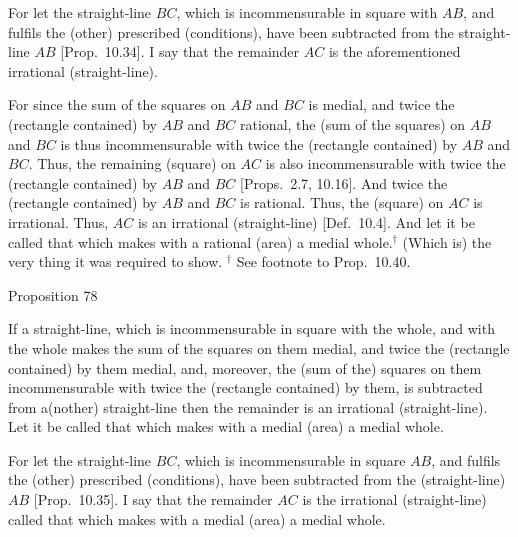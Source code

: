For let the straight-line $BC$, which is incommensurable in
square with $AB$, and fulfils the (other) prescribed (conditions), have been
subtracted from the straight-line $AB$ [Prop.~10.34]. I say that the remainder
$AC$ is the aforementioned irrational (straight-line).

For since the sum of the squares on $AB$ and $BC$ is medial, and
twice the (rectangle contained) by $AB$ and $BC$ rational,
the (sum of the squares) on $AB$ and $BC$ is thus incommensurable
with twice the (rectangle contained) by $AB$ and $BC$. Thus, the
remaining (square) on $AC$ is also incommensurable with
twice the (rectangle contained) by $AB$ and $BC$ [Props.~2.7, 10.16]. And twice
the (rectangle contained) by $AB$ and $BC$ is rational. 
Thus, the (square) on $AC$ is irrational. Thus, $AC$ is an
irrational (straight-line) [Def.~10.4]. And let it be
called that which makes
with a rational (area) a medial whole.$^\dag$ (Which is) the very thing it
was required to show.
{\footnotesize\noindent$^\dag$ See footnote to Prop.~10.40.}


\begin{center}
{\large Proposition 78}
\end{center}

If a straight-line, which is incommensurable in square with the whole, and with the whole
makes the sum of the squares on them medial, and twice the (rectangle
contained) by them medial, and, moreover, the (sum of the) squares on them
incommensurable with twice the (rectangle contained) by them, is
subtracted from a(nother) straight-line  then the
remainder is an irrational (straight-line). Let it be called that which makes
with a medial (area) a medial whole.

\epsfysize=1.7in 
\centerline{}

For let the straight-line $BC$, which is incommensurable in square
$AB$, and fulfils the (other) prescribed (conditions), have been subtracted from the
(straight-line) $AB$ [Prop.~10.35].  I say that the remainder $AC$ is the irrational (straight-line) called  that which makes with a medial (area) a medial whole.

